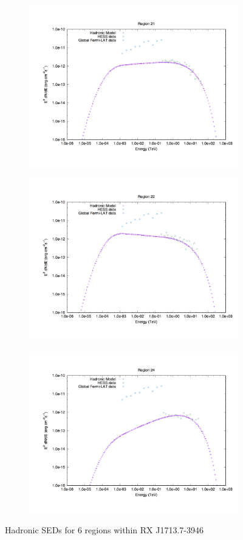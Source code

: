 \documentclass[12pt,a4paper]{article}
\begin{document}
\begin{figure}[H]
\begin{subfigure}{0.5\textwidth}
		\label{fig:rxj1713lephad16}
	\end{subfigure}
	\begin{subfigure}{0.5\textwidth}
		\centering
		\includegraphics[width=0.7\linewidth, height=0.27\textheight, angle=-90]{rxj1713_had21}
		\label{fig:rxj1713lephad21}
	\end{subfigure}
	\begin{subfigure}{0.5\textwidth}
		\centering
		\includegraphics[width=0.7\linewidth, height=0.27\textheight, angle=-90]{rxj1713_had22}
		\label{fig:rxj1713lephad22}
	\end{subfigure}
	\begin{subfigure}{0.5\textwidth}
		\centering
		\includegraphics[width=0.7\linewidth, height=0.27\textheight, angle=-90]{rxj1713_had24}
		\label{fig:rxj1713lephad24}
	\end{subfigure}
	\caption{Hadronic SEDs for 6 regions within RX J1713.7-3946}
	\label{fig:regionalhadseds}
\end{figure}
\end{document}
